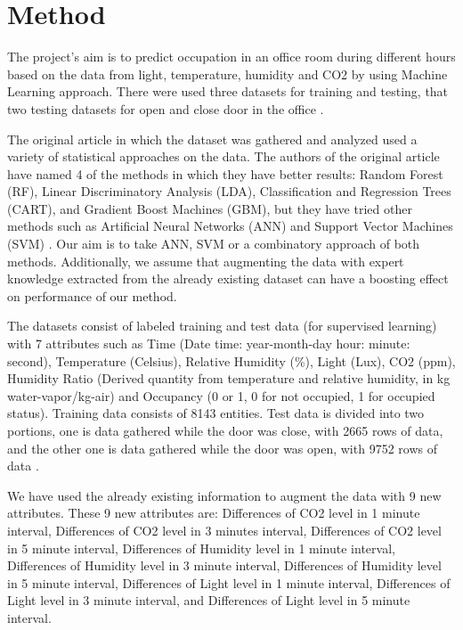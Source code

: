 \documentclass[conference]{IEEEtran}
\begin{document}
\section{Method}
The project's aim is to predict occupation in an office room during different hours based on the data from light, temperature, humidity and CO2 by using Machine Learning approach. There were used three datasets for training and testing, that two testing datasets for open and close door in the office \cite{Candanedo}.


The original article in which the dataset was gathered and analyzed used a variety of statistical approaches on the data. The authors of the original article have named 4 of the methods in which they have better results: Random Forest (RF), Linear Discriminatory Analysis (LDA), Classification and Regression Trees (CART), and Gradient Boost Machines (GBM), but they have tried other methods such as Artificial Neural Networks (ANN) and Support Vector Machines (SVM) \cite{Erickson}. Our aim is to take ANN, SVM or a combinatory approach of both methods. Additionally, we assume that augmenting the data with expert knowledge extracted from the already existing dataset can have a boosting effect on performance of our method.

The datasets consist of labeled training and test data (for supervised learning) with 7 attributes such as Time (Date time: year-month-day hour: minute: second), Temperature (Celsius), Relative Humidity (\%), Light (Lux), CO2 (ppm), Humidity Ratio (Derived quantity from temperature and relative humidity, in kg water-vapor/kg-air) and Occupancy (0 or 1, 0 for not occupied, 1 for occupied status). Training data consists of 8143 entities. Test data is divided into two portions, one is data gathered while the door was close, with 2665 rows of data, and the other one is data gathered while the door was open, with 9752 rows of data \cite{Ryu}.

We have used the already existing information to augment the data with 9 new attributes. These 9 new attributes are: Differences of CO2 level in 1 minute interval, Differences of CO2 level in 3 minutes interval, Differences of CO2 level in 5 minute interval, Differences of Humidity level in 1 minute interval, Differences of Humidity level in 3 minute interval, Differences of Humidity level in 5 minute interval, Differences of Light level in 1 minute interval, Differences of Light level in 3 minute interval, and Differences of Light level in 5 minute interval.
\end{document}
